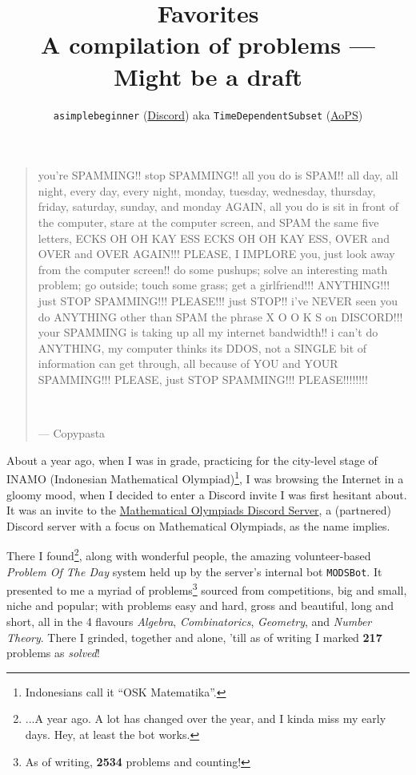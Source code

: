 \documentclass[11pt]{article} %
\title{\textbf{Favorites} \\ \normalsize A compilation of problems --- Might be a draft}
\author{\texttt{asimplebeginner} (\href{https://discord.gg/mods}{Discord}) aka \texttt{TimeDependentSubset} (\href{https://artofproblemsolving.com/community/user/1281032}{AoPS})}
\theoremstyle{definition}
\theoremstyle{remark}
\begin{document}
\maketitle

\begin{quotation}
\begin{FlushRight}
\begin{minipage}{0.9\linewidth}
\begin{FlushRight}
    \scriptsize
    you're SPAMMING!! stop SPAMMING!! all you do is SPAM!! all day, all night, every day, every night, monday, tuesday, wednesday, thursday, friday, saturday, sunday, and monday AGAIN, all you do is sit in front of the computer, stare at the computer screen, and SPAM the same five letters, ECKS OH OH KAY ESS ECKS OH OH KAY ESS, OVER and OVER and OVER AGAIN!!! PLEASE, I IMPLORE you, just look away from the computer screen!! do some pushups; solve an interesting math problem; go outside; touch some grass; get a girlfriend!!! ANYTHING!!! just STOP SPAMMING!!! PLEASE!!! just STOP!! i've NEVER seen you do ANYTHING other than SPAM the phrase X O O K S on DISCORD!!! your SPAMMING is taking up all my internet bandwidth!! i can't do ANYTHING, my computer thinks its DDOS, not a SINGLE bit of information can get through, all because of YOU and YOUR SPAMMING!!! PLEASE, just STOP SPAMMING!!! PLEASE!!!!!!!! 
\end{FlushRight}
\end{minipage} \\[0.5em]
\end{FlushRight}
--- \;Copypasta
\end{quotation}

About a year ago, when I was in  grade, practicing for the city-level stage of INAMO (Indonesian Mathematical Olympiad)\footnote{Indonesians call it ``OSK Matematika''.}, I was browsing the Internet in a gloomy mood, when I decided to enter a Discord invite I was first hesitant about. It was an invite to the \href{https://discord.gg/mods}{Mathematical Olympiads Discord Server}, a (partnered) Discord server with a focus on Mathematical Olympiads, as the name implies.

There I found\footnote{...A year ago. A lot has changed over the year, and I kinda miss my early days. Hey, at least the bot works.}, along with wonderful people, the amazing volunteer-based \emph{Problem Of The Day} system held up by the server's internal bot \texttt{MODSBot}. It presented to me a myriad of problems\footnote{As of writing, \textbf{2534} problems and counting!} sourced from competitions, big and small, niche and popular; with problems easy and hard, gross and beautiful, long and short, all in the 4 flavours \emph{Algebra}, \emph{Combinatorics}, \emph{Geometry}, and \emph{Number Theory}. There I grinded, together and alone, 'till as of writing I marked \textbf{217} problems as \emph{solved}!
\end{document}
